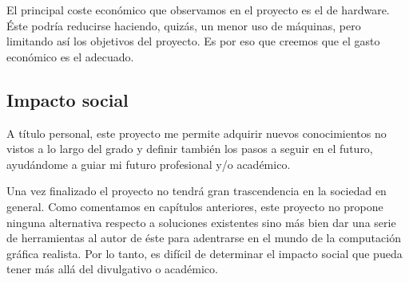 \documentclass[titlepage,12pt]{report}
\begin{document}
El principal coste económico que observamos en el proyecto es el de hardware. Éste podría reducirse haciendo, quizás, un menor uso de máquinas, pero limitando así los objetivos del proyecto. Es por eso que creemos que el gasto económico es el adecuado.

\subsection{Impacto social}

A título personal, este proyecto me permite adquirir nuevos conocimientos no vistos a lo largo del grado y definir también los pasos a seguir en el futuro, ayudándome a guiar mi futuro profesional y/o académico.

Una vez finalizado el proyecto no tendrá gran trascendencia en la sociedad en general. Como comentamos en capítulos anteriores, este proyecto no propone ninguna alternativa respecto a soluciones existentes sino más bien dar una serie de herramientas al autor de éste para adentrarse en el mundo de la computación gráfica realista. Por lo tanto, es difícil de determinar el impacto social que pueda tener más allá del divulgativo o académico.

\newpage
\nocite{*}

\printbibliography

\listoffigures
\listoftables
\end{document}
